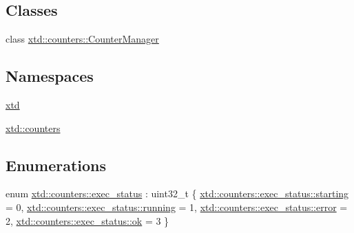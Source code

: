 \subsection*{Classes}
\begin{DoxyCompactItemize}
\item 
class \hyperlink{classxtd_1_1counters_1_1CounterManager}{xtd\-::counters\-::\-Counter\-Manager}
\end{DoxyCompactItemize}
\subsection*{Namespaces}
\begin{DoxyCompactItemize}
\item 
\hyperlink{namespacextd}{xtd}
\item 
\hyperlink{namespacextd_1_1counters}{xtd\-::counters}
\end{DoxyCompactItemize}
\subsection*{Enumerations}
\begin{DoxyCompactItemize}
\item 
enum \hyperlink{namespacextd_1_1counters_a408a8b2fd75b44228e1741ac4a32aff8}{xtd\-::counters\-::exec\-\_\-status} \-: uint32\-\_\-t \{ \hyperlink{namespacextd_1_1counters_a408a8b2fd75b44228e1741ac4a32aff8a1ee85f6c60017a7f0646ba8dc5824de6}{xtd\-::counters\-::exec\-\_\-status\-::starting} = 0, 
\hyperlink{namespacextd_1_1counters_a408a8b2fd75b44228e1741ac4a32aff8a75101dcdfc88455bcafc9e53e0b06689}{xtd\-::counters\-::exec\-\_\-status\-::running} = 1, 
\hyperlink{namespacextd_1_1counters_a408a8b2fd75b44228e1741ac4a32aff8acb5e100e5a9a3e7f6d1fd97512215282}{xtd\-::counters\-::exec\-\_\-status\-::error} = 2, 
\hyperlink{namespacextd_1_1counters_a408a8b2fd75b44228e1741ac4a32aff8a444bcb3a3fcf8389296c49467f27e1d6}{xtd\-::counters\-::exec\-\_\-status\-::ok} = 3
 \}
\end{DoxyCompactItemize}
